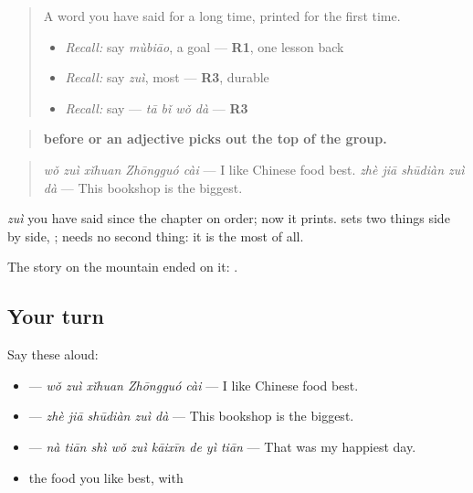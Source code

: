 \label{lesson:ZH-C287-zui-most}



\begin{quote}
A word you have said for a long time, printed for the first time.

\begin{itemize}
\raggedright
  \item \emph{Recall:} say \emph{mùbiāo}, a goal — \textbf{R1}, one lesson back
  \item \emph{Recall:} say \emph{zuì}, most — \textbf{R3}, durable
  \item \emph{Recall:} say  — \emph{tā bǐ wǒ dà} — \textbf{R3}
\end{itemize}
\end{quote}

\begin{grammarlens}[title={Grammar Lens: \zh{最}, the most of all}]
\begin{quote}
\textbf{ before  or an adjective picks out the top of the group.}
\end{quote}

\begin{quote}
\textbf{} \emph{wǒ zuì xǐhuan Zhōngguó cài} — I like Chinese food best. \textbf{} \emph{zhè jiā shūdiàn zuì dà} — This bookshop is the biggest.
\end{quote}

\emph{zuì} you have said since the chapter on order; now it prints.  sets two things side by side, ;  needs no second thing: it is the most of all.

The story on the mountain ended on it: .
\end{grammarlens}

\subsection*{Your turn}
Say these aloud:

\begin{itemize}
\raggedright
  \item {} — \emph{wǒ zuì xǐhuan Zhōngguó cài} — I like Chinese food best.
  \item {} — \emph{zhè jiā shūdiàn zuì dà} — This bookshop is the biggest.
  \item {} — \emph{nà tiān shì wǒ zuì kāixīn de yì tiān} — That was my happiest day.
  \item the food you like best, with 
\end{itemize}

